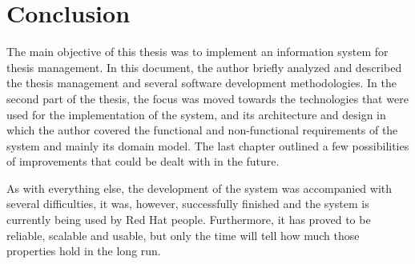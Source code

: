 \chapter{Conclusion}

The main objective of this thesis was to implement an information system for thesis management. In this document, the author briefly analyzed and described the thesis management and several software development methodologies. In the second part of the thesis, the focus was moved towards the technologies that were used for the implementation of the system, and its architecture and design in which the author covered the functional and non-functional requirements of the system and mainly its domain model. The last chapter outlined a few possibilities of improvements that could be dealt with in the future.

As with everything else, the development of the system was accompanied with several difficulties, it was, however, successfully finished and the system is currently being used by Red Hat people. Furthermore, it has proved to be reliable, scalable and usable, but only the time will tell how much those properties hold in the long run.